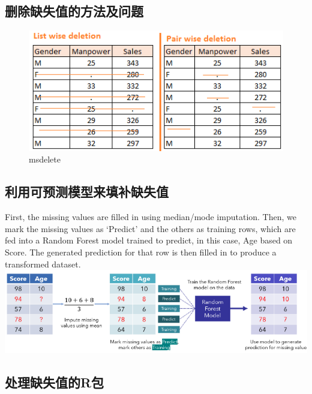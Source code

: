 \documentclass[
]{book}
\begin{document}
\hypertarget{ux5220ux9664ux7f3aux5931ux503cux7684ux65b9ux6cd5ux53caux95eeux9898}{%
\subsection{删除缺失值的方法及问题}\label{ux5220ux9664ux7f3aux5931ux503cux7684ux65b9ux6cd5ux53caux95eeux9898}}

\begin{figure}
\centering
\includegraphics{pics/msdelete.png}
\caption{msdelete}
\end{figure}

\hypertarget{ux5229ux7528ux53efux9884ux6d4bux6a21ux578bux6765ux586bux8865ux7f3aux5931ux503c}{%
\subsection{利用可预测模型来填补缺失值}\label{ux5229ux7528ux53efux9884ux6d4bux6a21ux578bux6765ux586bux8865ux7f3aux5931ux503c}}

First, the missing values are filled in using median/mode imputation. Then, we mark the missing values as `Predict' and the others as training rows, which are fed into a Random Forest model trained to predict, in this case, Age based on Score. The generated prediction for that row is then filled in to produce a transformed dataset.
\includegraphics{pics/missforest.png}

\hypertarget{ux5904ux7406ux7f3aux5931ux503cux7684rux5305}{%
\subsection{处理缺失值的R包}\label{ux5904ux7406ux7f3aux5931ux503cux7684rux5305}}
\end{document}
